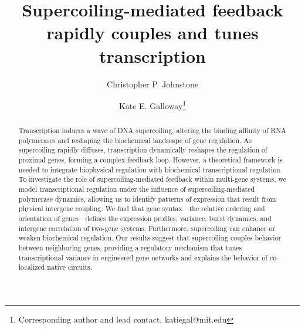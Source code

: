 \documentclass[11pt]{article} %
\title{Supercoiling-mediated feedback rapidly couples and tunes transcription}
\author{Christopher P. Johnstone}
\author{Kate E. Galloway\thanks{Corresponding author and lead contact, katiegal@mit.edu}}
\affil{Department of Chemical Engineering, MIT, 25 Ames St., Cambridge, MA 02139, USA}
\date{}
\begin{document}
\maketitle

\begin{abstract} \noindent
   Transcription induces a wave of DNA supercoiling, altering the binding affinity of RNA polymerases and reshaping the biochemical landscape of gene regulation. As supercoiling rapidly diffuses, transcription dynamically reshapes the regulation of proximal genes, forming a complex feedback loop. However, a theoretical framework is needed to integrate biophysical regulation with biochemical transcriptional regulation. To investigate the role of supercoiling-mediated feedback within multi-gene systems, we model transcriptional regulation under the influence of supercoiling-mediated polymerase dynamics, allowing us to identify patterns of expression that result from physical intergene coupling. We find that gene syntax—the relative ordering and orientation of genes—defines the expression profiles, variance, burst dynamics, and intergene correlation of two-gene systems. Furthermore, supercoiling can enhance or weaken biochemical regulation. Our results suggest that supercoiling couples behavior between neighboring genes, providing a regulatory mechanism that tunes transcriptional variance in engineered gene networks and explains the behavior of co-localized native circuits. 
\end{abstract}
\end{document}
